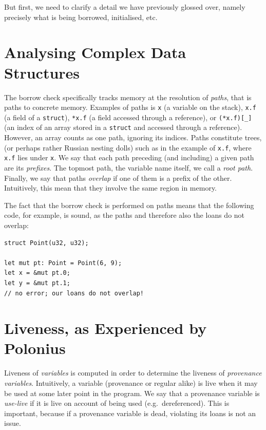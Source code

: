 \documentclass[11pt,a4paper,twoside,openany,draft]{report}
\newcommand{\InRust}[1]{\texttt{#1}}
\begin{document}
But first, we need to clarify a detail we have previously glossed over, namely
precisely what is being borrowed, initialised, etc.

\section{Analysing Complex Data Structures}\label{sec:paths}

The borrow check specifically tracks memory at the resolution of \textit{paths},
that is paths to concrete memory. Examples of paths is \InRust{x} (a variable on
the stack), \InRust{x.f} (a field of a \InRust{struct}), \InRust{*x.f} (a field
accessed through a reference), or \InRust{(*x.f)[_]} (an index of an array
stored in a \InRust{struct} and accessed through a reference). However, an array
counts as one path, ignoring its indices. Paths constitute trees, (or perhaps
rather Russian nesting dolls) such as in the example of \InRust{x.f}, where
\InRust{x.f} lies under \InRust{x}. We say that each path preceding (and
including) a given path are its \textit{prefixes}. The topmost path, the
variable name itself, we call a \textit{root path}. Finally, we say that paths
\textit{overlap} if one of them is a prefix of the other. Intuitively, this mean
that they involve the same region in memory.


The fact that the borrow check is performed on paths means that the following
code, for example, is sound, as the paths and therefore also the loans do not
overlap:
\begin{verbatim}
struct Point(u32, u32);

let mut pt: Point = Point(6, 9);
let x = &mut pt.0;
let y = &mut pt.1;
// no error; our loans do not overlap!
\end{verbatim}

\section{Liveness, as Experienced by Polonius}\label{sec:liveness}

Liveness of \emph{variables} is computed in order to determine the liveness of
\emph{provenance variables}. Intuitively, a variable (provenance or regular
alike) is live when it may be used at some later point in the program. We say
that a provenance variable is \textit{use-live} if it is live on account of
being used (e.g.\ dereferenced). This is important, because if a provenance
variable is dead, violating its loans is not an issue.
\end{document}
